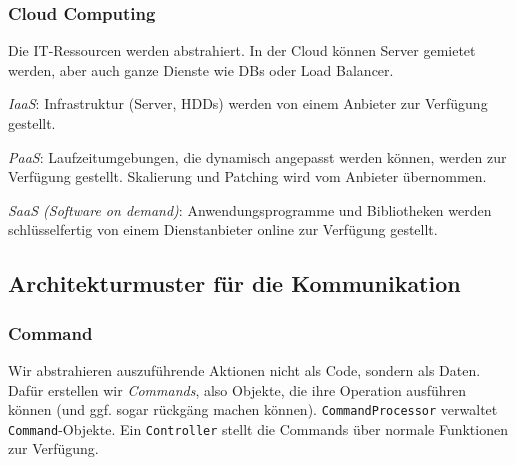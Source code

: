 \documentclass[german]{panikzettel}
\begin{document}
\subsubsection{Cloud Computing}
Die IT-Ressourcen werden abstrahiert.
In der Cloud können Server gemietet werden, aber auch ganze Dienste wie DBs oder Load Balancer.

\emph{IaaS}: Infrastruktur (Server, HDDs) werden von einem Anbieter zur Verfügung gestellt.

\emph{PaaS}: Laufzeitumgebungen, die dynamisch angepasst werden können, werden zur Verfügung gestellt.
Skalierung und Patching wird vom Anbieter übernommen.

\emph{SaaS (Software on demand)}: Anwendungsprogramme und Bibliotheken werden
schlüsselfertig von einem Dienstanbieter online zur Verfügung gestellt.

\subsection{Architekturmuster für die Kommunikation}

\subsubsection{Command}

Wir abstrahieren auszuführende Aktionen nicht als Code, sondern als Daten.
Dafür erstellen wir \emph{Commands}, also Objekte, die ihre Operation ausführen können (und ggf. sogar rückgäng machen können).
\lstinline{CommandProcessor} verwaltet \lstinline{Command}-Objekte.
Ein \lstinline{Controller} stellt die Commands über normale Funktionen zur Verfügung.

\end{document}
